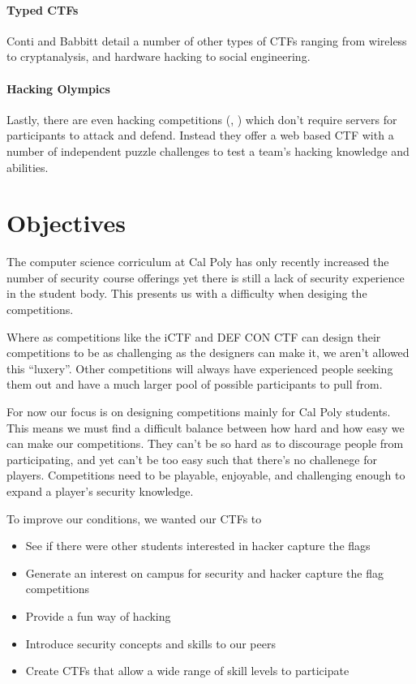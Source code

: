 \documentclass[10pt]{article}
\begin{document}
\paragraph*{Typed CTFs} Conti and Babbitt
\cite{HackingCompetitionsForSecurityEducation} detail a number of other types
of CTFs ranging from wireless to cryptanalysis, and hardware hacking to social
engineering.

\paragraph*{Hacking Olympics} Lastly, there are even hacking competitions
(\cite{Cipher}, \cite{SMPCTF}) which don't require servers for participants to
attack and defend. Instead they offer a web based CTF with a number of
independent puzzle challenges to test a team's hacking knowledge and abilities.

\section{Objectives}
The computer science corriculum at Cal Poly has only recently increased the
number of security course offerings yet there is still a lack of security
experience in the student body. This presents us with a difficulty when desiging
the competitions. 

Where as competitions like the iCTF and DEF CON CTF can design their
competitions to be as challenging as the designers can make it, we aren't
allowed this ``luxery''. Other competitions will always have experienced people
seeking them out and have a much larger pool of possible participants to pull
from.

For now our focus is on designing competitions mainly for Cal Poly students.
This means we must find a difficult balance between how hard and how easy we can
make our competitions. They can't be so hard as to discourage people from
participating, and yet can't be too easy such that there's no challenege for
players. Competitions need to be playable, enjoyable, and challenging enough to
expand a player's security knowledge.

To improve our conditions, we wanted our CTFs to


\begin{itemize}
    \item See if there were other students interested in hacker capture the
    flags
    \item Generate an interest on campus for security and hacker capture the
    flag competitions
    \item Provide a fun way of hacking 
    \item Introduce security concepts and skills to our peers
    \item Create CTFs that allow a wide range of skill levels to participate
\end{itemize}
\end{document}
